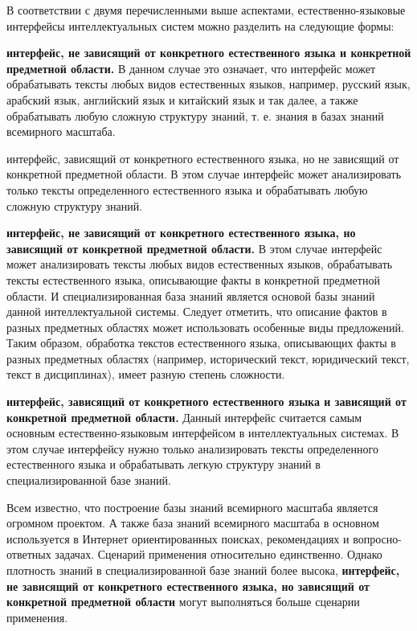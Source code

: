 В соответствии с двумя перечисленными выше аспектами, естественно-языковые интерфейсы интеллектуальных систем можно разделить на следующие формы:
\begin{textitemize}
	\item \textbf{интерфейс, не зависящий от конкретного естественного языка и конкретной предметной области.} В данном случае это означает, что интерфейс может обрабатывать тексты любых видов естественных языков, например, русский язык, арабский язык, английский язык и китайский язык и так далее, а также обрабатывать любую сложную структуру знаний, т. е. знания в базах знаний всемирного масштаба.
	\item интерфейс, зависящий от конкретного естественного языка, но не зависящий от конкретной предметной области. В этом случае интерфейс может анализировать только тексты определенного естественного языка и обрабатывать любую сложную структуру знаний. 
	\item \textbf{интерфейс, не зависящий от конкретного естественного языка, но зависящий от конкретной предметной области.} В этом случае интерфейс может анализировать тексты любых видов естественных языков, обрабатывать тексты естественного языка, описывающие факты в конкретной предметной области. И специализированная база знаний является основой базы знаний данной интеллектуальной системы. Следует отметить, что описание фактов в разных предметных областях может использовать особенные виды предложений. Таким образом, обработка текстов естественного языка, описывающих факты в разных предметных областях (например, исторический текст, юридический текст, текст в дисциплинах), имеет разную степень сложности.
	\item \textbf{интерфейс, зависящий от конкретного естественного языка и зависящий от конкретной предметной области.} Данный интерфейс считается самым основным естественно-языковым интерфейсом в интеллектуальных системах. В этом случае интерфейсу нужно только анализировать тексты определенного естественного языка и обрабатывать легкую структуру знаний в специализированной базе знаний. 	
\end{textitemize}

Всем известно, что построение базы знаний всемирного масштаба является огромном проектом. А также база знаний всемирного масштаба в основном используется в Интернет ориентированных поисках, рекомендациях и вопросно-ответных задачах. Сценарий применения относительно единственно. Однако плотность знаний в специализированной базе знаний более высока, \textbf{интерфейс, не зависящий от конкретного естественного языка, но зависящий от конкретной предметной области} могут выполняться больше сценарии применения. 

